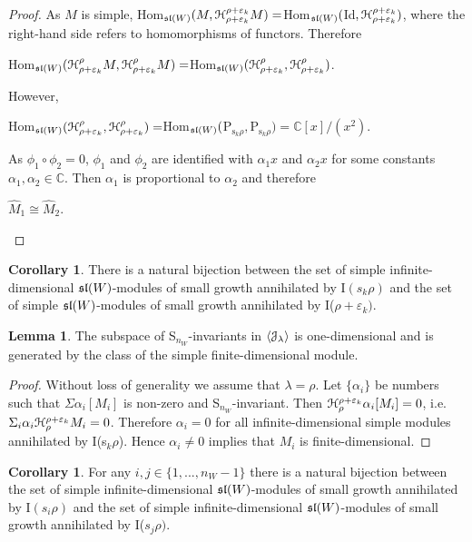 \documentclass[12pt]{amsart}
\theoremstyle{definition}\newtheorem{theorem}{Theorem}[section]
\newtheorem{lemma}[proposition]{Lemma}
\newtheorem{corollary}[proposition]{Corollary}
\theoremstyle{definition}\newtheorem{definition}[proposition]{Definition}
\theoremstyle{remark}\newtheorem{example}[proposition]{Example}
\begin{document}
\begin{proof}
As $M$ is simple, Hom$_{\frak{sl}(W)}(M, \EuScript H^{\rho+\varepsilon_k}_{\rho+\varepsilon_k}M)=$Hom$_{\frak{sl}(W)}($Id$, \EuScript H^{\rho+\varepsilon_k}_{\rho+\varepsilon_k})$, where the right-hand side refers to homomorphisms of functors. Therefore\begin{center} Hom$_{\frak{sl}(W)}(\EuScript H^\rho_{\rho+\varepsilon_k}M, \EuScript H^\rho_{\rho+\varepsilon_k}M)=$Hom$_{\frak{sl}(W)}(\EuScript H^\rho_{\rho+\varepsilon_k}, \EuScript H^\rho_{\rho+\varepsilon_k})$.\end{center} However,\begin{center} Hom$_{\frak{sl}(W)}(\EuScript H^\rho_{\rho+\varepsilon_k}, \EuScript H^\rho_{\rho+\varepsilon_k})=$Hom$_{\frak{sl}(W)}($P$_{\mathrm s_k\rho}, $P$_{\mathrm s_k\rho})=\mathbb C[x]/(x^2)$.\end{center} As $\phi_1\circ\phi_2=0$, $\phi_1$ and $\phi_2$ are identified with $\alpha_1x$ and $\alpha_2x$ for some constants $\alpha_1, \alpha_2\in\mathbb C$. Then $\alpha_1$ is proportional to $\alpha_2$ and therefore \begin{center}$\hat M_1\cong\hat M_2$.\end{center}\end{proof}
\begin{corollary}\label{Crisi} There is a natural bijection between the set of simple infinite-dimensional $\frak{sl}(W)$-modules of small growth annihilated by I$(s_k\rho)$ and the set of simple $\frak{sl}(W)$-modules of small growth annihilated by I($\rho+\varepsilon_k)$.\end{corollary}
\begin{lemma} The subspace of S$_{n_W}$-invariants in $\langle\EuScript J_\lambda\rangle$ is one-dimensional and is generated by the class of the simple finite-dimensional module.\end{lemma}
\begin{proof} Without loss of generality we assume that $\lambda=\rho$. Let $\{\alpha_i\}$ be numbers such that $\Sigma \alpha_i[M_i]$ is non-zero and S$_{n_W}$-invariant. Then $\EuScript H_\rho^{\rho+\varepsilon_k}\alpha_i[M_i]=0$, i.e. $\Sigma_i\alpha_i\EuScript H_\rho^{\rho+\varepsilon_k}M_i=0$. Therefore $\alpha_i=0$ for all infinite-dimensional simple modules annihilated by I(s$_k\rho$). Hence $\alpha_i\ne 0$ implies that $M_i$ is finite-dimensional.\end{proof}
\begin{corollary}For any $i, j\in\{1,..., n_W-1\}$ there is a natural bijection between the set of simple infinite-dimensional $\frak{sl}(W)$-modules of small growth annihilated by I$(s_i\rho)$ and the set of simple infinite-dimensional $\frak{sl}(W)$-modules of small growth annihilated by I($s_j\rho)$.\end{corollary}
\end{document}
